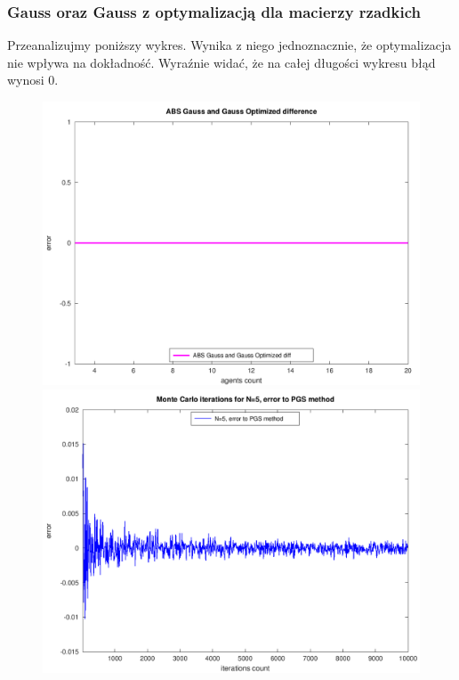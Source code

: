 \documentclass[10pt]{article}
\begin{document}
\subsubsection{Gauss oraz Gauss z optymalizacją dla macierzy rzadkich}
Przeanalizujmy poniższy wykres. Wynika z niego jednoznacznie, że optymalizacja nie wpływa na dokładność. Wyraźnie widać, że na całej długości wykresu błąd wynosi 0.
\begin{figure}[h]
\centering
\includegraphics[scale=0.45]{plots/07_abs_gauss_and_gauss_optimized_all_rows.png}
\includegraphics[scale=0.45]{plots/08_abs_gauss_and_montecarlo_iterations_rows.png}
\end{figure}
\end{document}
